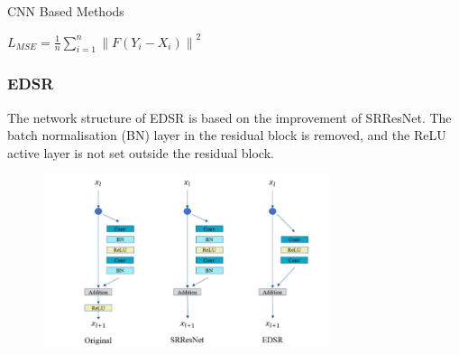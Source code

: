 \documentclass[11pt, presentation]{beamer}
\begin{document}
\begin{section}{CNN Based Methods}
\begin{frame}
{                \hfill$ L_{MSE}=\frac{1}{n}\sum_{i=1}^{n}\left\| F(Y_{i}-X_{i})\right\|^2 $\hfill
            }
        \end{frame}
        \begin{frame}
            \frametitle{EDSR}
            The network structure of EDSR is based on the improvement of SRResNet.
            The batch normalisation (BN) layer in the residual block is removed, and the ReLU active layer is not set outside the
            residual block.
            \begin{figure}
                \includegraphics[width=0.75\textwidth]{images/edsr-srresnet-rb}

\end{figure}
\end{frame}
\end{section}
\end{document}
